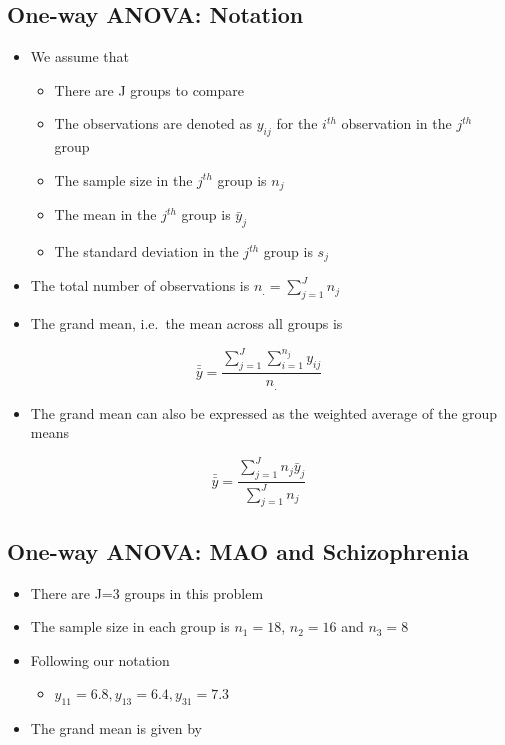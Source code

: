 \documentclass[
]{book}
\providecommand{\tightlist}{%
  \setlength{\itemsep}{0pt}\setlength{\parskip}{0pt}}
\begin{document}
\hypertarget{one-way-anova-notation}{%
\subsection{One-way ANOVA: Notation}\label{one-way-anova-notation}}

\begin{itemize}
\tightlist
\item
  We assume that

  \begin{itemize}
  \tightlist
  \item
    There are J groups to compare
  \item
    The observations are denoted as \(y_{ij}\) for the \(i^{th}\) observation in the \(j^{th}\) group
  \item
    The sample size in the \(j^{th}\) group is \(n_j\)
  \item
    The mean in the \(j^{th}\) group is \(\bar y_j\)
  \item
    The standard deviation in the \(j^{th}\) group is \(s_j\)
  \end{itemize}
\item
  The total number of observations is \(n_.=\sum_{j=1}^Jn_j\)
\item
  The grand mean, i.e.~the mean across all groups is
\end{itemize}

\[\bar{\bar y}=\frac{\sum_{j=1}^J\sum_{i=1}^{n_j}y_{ij}}{n_.}\]

\begin{itemize}
\tightlist
\item
  The grand mean can also be expressed as the weighted average of the group means
\end{itemize}

\[\bar{\bar y}=\frac{\sum_{j=1}^Jn_j\bar y_{j}}{\sum_{j=1}^Jn_j}\]

\hypertarget{one-way-anova-mao-and-schizophrenia}{%
\subsection{One-way ANOVA: MAO and Schizophrenia}\label{one-way-anova-mao-and-schizophrenia}}

\begin{itemize}
\tightlist
\item
  There are J=3 groups in this problem
\item
  The sample size in each group is \(n_1 = 18\), \(n_2 = 16\) and \(n_3 = 8\)
\item
  Following our notation

  \begin{itemize}
  \tightlist
  \item
    \(y_{11} = 6.8, y_{13} = 6.4, y_{31} = 7.3\)
  \end{itemize}
\item
  The grand mean is given by
\end{itemize}
\end{document}
